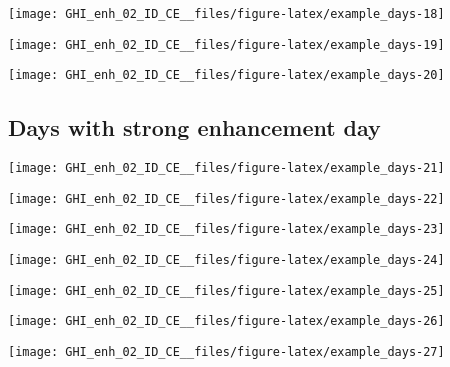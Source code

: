\documentclass[
  10pt,
  a4paper,oneside]{article}
\begin{document}
\begin{center}\texttt{[image: GHI\_enh\_02\_ID\_CE\_\_files/figure-latex/example\_days-18]} \end{center}

\begin{center}\texttt{[image: GHI\_enh\_02\_ID\_CE\_\_files/figure-latex/example\_days-19]} \end{center}

\begin{center}\texttt{[image: GHI\_enh\_02\_ID\_CE\_\_files/figure-latex/example\_days-20]} \end{center}

\FloatBarrier

\hypertarget{days-with-strong-enhancement-day}{%
\subsection{Days with strong enhancement day}\label{days-with-strong-enhancement-day}}

\begin{center}\texttt{[image: GHI\_enh\_02\_ID\_CE\_\_files/figure-latex/example\_days-21]} \end{center}

\begin{center}\texttt{[image: GHI\_enh\_02\_ID\_CE\_\_files/figure-latex/example\_days-22]} \end{center}

\begin{center}\texttt{[image: GHI\_enh\_02\_ID\_CE\_\_files/figure-latex/example\_days-23]} \end{center}

\begin{center}\texttt{[image: GHI\_enh\_02\_ID\_CE\_\_files/figure-latex/example\_days-24]} \end{center}

\begin{center}\texttt{[image: GHI\_enh\_02\_ID\_CE\_\_files/figure-latex/example\_days-25]} \end{center}

\begin{center}\texttt{[image: GHI\_enh\_02\_ID\_CE\_\_files/figure-latex/example\_days-26]} \end{center}

\begin{center}\texttt{[image: GHI\_enh\_02\_ID\_CE\_\_files/figure-latex/example\_days-27]} \end{center}
\end{document}
